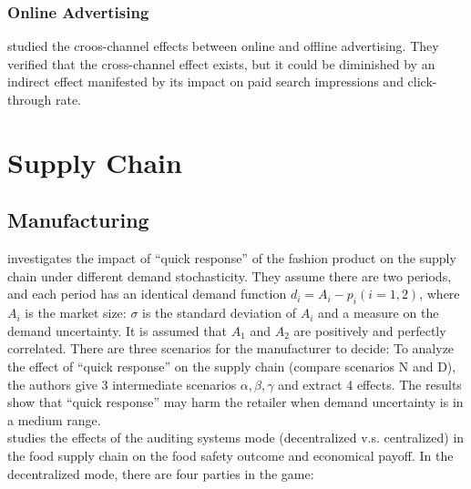 \documentclass[10pt]{report}
\begin{document}
\subsubsection{Online Advertising}
\cite{Dinner2014a} studied the croos-channel effects between online and offline advertising. They verified that the cross-channel effect exists, but it could be 
diminished by an indirect effect manifested by its impact on paid search impressions and click-through rate. 

\clearpage
\section{Supply Chain}

\subsection{Manufacturing}
\cite{chen2023quick} investigates the impact of ``quick response'' of the fashion product on the supply chain under
different demand stochasticity. They assume there are two periods, and each period has an identical demand function $d_i=A_i-p_i(i=1,2)$, where $A_i$ is the market size:
$\sigma$ is the standard deviation of $A_i$ and a measure on the demand uncertainty. It is assumed that $A_1$ and $A_2$ are positively and perfectly correlated. There are three scenarios for
the manufacturer to decide:
To analyze the effect of ``quick response'' on the supply chain (compare scenarios N and D), the authors give 3 intermediate scenarios $\alpha,\beta,\gamma$ and extract 4 effects.
The results show that ``quick response'' may harm the retailer when demand uncertainty is in a medium range.\\
\cite{dong2022food} studies the effects of the auditing systems mode (decentralized v.s. centralized) in the food supply chain
on the food safety outcome and economical payoff. In the decentralized mode, there are four parties in the game:
\end{document}
